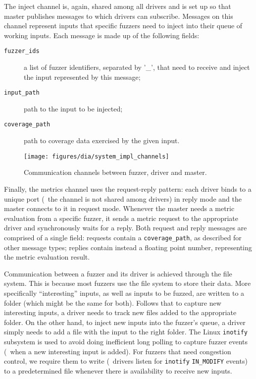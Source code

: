 The inject channel is, again, shared among all drivers and is set up so that
master publishes messages to which drivers can subscribe. Messages on this
channel represent inputs that specific fuzzers need to inject into their queue
of working inputs. Each message is made up of the following fields:

\begin{description}
    \item[\texttt{fuzzer\_ids}] a list of fuzzer identifiers, separated by '\_',
        that need to receive and inject the input represented by this message;
    \item[\texttt{input\_path}] path to the input to be injected;
    \item[\texttt{coverage\_path}] path to coverage data exercised by the given
        input.
\end{description}

\begin{figure}[t]
    \centering
    \texttt{[image: figures/dia/system\_impl\_channels]}
    \caption{Communication channels between fuzzer, driver and master.}
    \label{fig:system-impl}
\end{figure}

Finally, the metrics channel uses the request-reply pattern: each driver binds
to a unique port (\ie~the channel is not shared among drivers) in reply mode and
the master connects to it in request mode. Whenever the master needs a metric
evaluation from a specific fuzzer, it sends a metric request to the appropriate
driver and synchronously waits for a reply. Both request and reply messages are
comprised of a single field: requests contain a \texttt{coverage\_path}, as
described for other message types; replies contain instead a floating point
number, representing the metric evaluation result.

Communication between a fuzzer and its driver is achieved through the file
system. This is because most fuzzers use the file system to store their data.
More specifically ``interesting'' inputs, as well as inputs to be fuzzed, are
written to a folder (which might be the same for both). Follows that to capture
new interesting inputs, a driver needs to track new files added to the
appropriate folder. On the other hand, to inject new inputs into the fuzzer's
queue, a driver simply needs to add a file with the input to the right folder.
The Linux \texttt{inotify} subsystem is used to avoid doing inefficient long
polling to capture fuzzer events (\eg~when a new interesting input is added).
For fuzzers that need congestion control, we require them to write (\ie~drivers
listen for \texttt{inotify} \texttt{IN\_MODIFY} events) to a predetermined file
whenever there is availability to receive new inputs.

